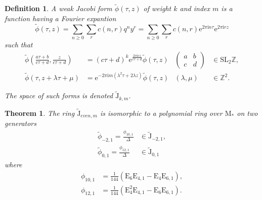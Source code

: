 \documentclass[uplatex,dvipdfmx]{jsarticle}
\newtheorem{definition}{Definition}[section]
\newtheorem{theorem}{Theorem}[section]
\begin{document}
\begin{definition}
    A \textit{weak Jacobi form} 
    $\tilde{\phi} \left( \tau, z \right)$
    of weight
    $k$
    and index
    $m$
    is a function having a Fourier expantion
    \begin{equation}
        \tilde{\phi} \left( \tau, z \right)
        =
        \sum_{n \geq 0}
        \sum_{r}
        c\left( n, r \right)
        q^ny^r
        =
        \sum_{n \geq 0}
        \sum_{r}
        c\left( n, r \right)
        \mathrm{e}^{2 \pi \mathrm{i} n \tau}
        \mathrm{e}^{2 \pi \mathrm{i} r z}
    \end{equation}
    such that
    \begin{align}
        \tilde{\phi}
        \left( 
            \frac{a \tau + b}{c \tau + d},
            \frac{z}         {c \tau + d}
        \right)
        &=
        (c \tau + d)^k
        \mathrm{e}^{\frac{2 \pi \mathrm{i} cz}{c \tau + d}}
        \tilde{\phi}
        \left( \tau, z \right)
        &\begin{pmatrix}
            a &b \\
            c &d 
        \end{pmatrix}
        &\in \mathrm{SL}_2{\mathbb{Z}},\\
        \tilde{\phi}
        \left( 
            \tau,
            z + \lambda \tau + \mu
        \right)
        &=
        \mathrm{e}
        ^{-2 \pi \mathrm{i} m(\lambda^2 \tau + 2 \lambda z)}
        \tilde{\phi}
        \left( \tau, z \right)
        &\left( \lambda, \mu \right)
        &\in \mathbb{Z}^2.
    \end{align}

    The space of such forms is denoted
    $\tilde{\mathrm{J}}_{k, m}$.
\end{definition}

\begin{theorem}
    The ring
    $\tilde{\mathrm{J}}_{even, m}$ 
    is isomorphic to a polynomial ring over
    $\mathrm{M}_*$
    on two generators
    \begin{align}
        \tilde{\phi}_{-2, 1}
        =
        \frac{\phi_{10, 1}}{\Delta}
        &\in
        \tilde{\mathrm{J}}_{-2, 1},\\
        \tilde{\phi}_{0, 1}
        =
        \frac{\phi_{12, 1}}{\Delta}
        &\in
        \tilde{\mathrm{J}}_{0, 1}
    \end{align}
    where
    \begin{align}
        \phi_{10, 1}
        &=
        \frac{1}{144}
        (\mathrm{E}_6 \mathrm{E}_{4, 1}
        -
        \mathrm{E}_4 \mathrm{E}_{6, 1}),\\
        \phi_{12, 1}
        &=
        \frac{1}{144}
        (\mathrm{E}_4^2 \mathrm{E}_{4, 1}
        -
        \mathrm{E}_6 \mathrm{E}_{6, 1}).
    \end{align}
\end{theorem}
\end{document}
